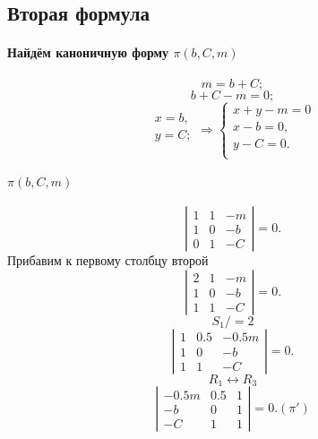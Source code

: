 \subsection{Вторая формула}
\paragraph{Найдём каноничную форму $\pi(b, C, m)$}

$$m = b + C;$$
$$b + C - m = 0;$$
$$
\begin{array}{l}
x = b,\\
y = C;\\
\end{array}
\Rightarrow
\left\{
	\begin{array}{l}
		x + y - m = 0 \\
		x - b = 0,\\
		y - C = 0.\\
	\end{array}
\right.
$$

\paragraph{$\pi(b, C, m)$}
$$
\left|
\begin{array}{lll}
	1 & 1 & -m \\
	1 & 0 & -b \\
	0 & 1 & -C
\end{array}
\right|
=0.
$$
Прибавим к первому столбцу второй
$$
\left|
\begin{array}{lll}
	2 & 1 & -m \\
	1 & 0 & -b \\
	1 & 1 & -C
\end{array}
\right|
=0.
$$
$$S_1 /= 2$$
$$
\left|
\begin{array}{lll}
	1 & 0.5 & -0.5m \\
	1 & 0 & -b \\
	1 & 1 & -C
\end{array}
\right|
=0.
$$
$$R_1 \leftrightarrow R_3$$
$$
\left|
\begin{array}{lll}
	-0.5m & 0.5 & 1 \\
	-b & 0 & 1 \\
	-C & 1 & 1
\end{array}
\right|
=0. (\pi')
$$
